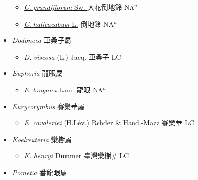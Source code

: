 \begin{itemize}
  \begin{itemize}
        \item[] \href{http://www.theplantlist.org/tpl1.1/search?q=Cardiospermum+grandiflorum}{\textit{C. grandiflorum} Sw. }   大花倒地鈴 NA$^n$
        \item[] \href{http://www.theplantlist.org/tpl1.1/search?q=Cardiospermum+halicacabum}{\textit{C. halicacabum} L.}   倒地鈴 NA$^n$
  \end{itemize}
 \item[] \textit{Dodonaea} 車桑子屬
                    
  \begin{itemize}
        \item[] \href{http://www.theplantlist.org/tpl1.1/search?q=Dodonaea+viscosa}{\textit{D. viscosa} (L.) Jacq.}   車桑子 LC
  \end{itemize}
 \item[] \textit{Euphoria} 龍眼屬
                    
  \begin{itemize}
        \item[] \href{http://www.theplantlist.org/tpl1.1/search?q=Euphoria+longana}{\textit{E. longana} Lam.}   龍眼 NA$^n$
  \end{itemize}
 \item[] \textit{Eurycorymbus} 賽欒華屬
                    
  \begin{itemize}
        \item[] \href{http://www.theplantlist.org/tpl1.1/search?q=Eurycorymbus+cavaleriei}{\textit{E. cavaleriei} (H.Lév.) Rehder \& Hand.-Mazz}   賽欒華 LC
  \end{itemize}
 \item[] \textit{Koelreuteria} 欒樹屬
                    
  \begin{itemize}
        \item[] \href{http://www.theplantlist.org/tpl1.1/search?q=Koelreuteria+henryi}{\textit{K. henryi} Dummer}   臺灣欒樹\# LC
  \end{itemize}
 \item[] \textit{Pometia} 番龍眼屬
                    

\end{itemize}
